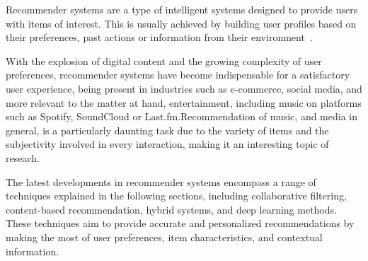 Recommender systems are a type of intelligent systems designed to provide users with items of interest. This is usually achieved by building user profiles based on their preferences, past actions or information from their environment~\cite{BOOK:RS-HANDBOOK}.

With the explosion of digital content and the growing complexity of user preferences, recommender systems have become indispensable for a satisfactory user experience, being present in industries such as e-commerce, social media, and more relevant to the matter at hand, entertainment, including music on platforms such as Spotify, SoundCloud or Last.fm.\@ Recommendation of music, and media in general, is a particularly daunting task due to the variety of items and the subjectivity involved in every interaction, making it an interesting topic of reseach.

The latest developments in recommender systems encompass a range of techniques explained in the following sections, including collaborative filtering, content-based recommendation, hybrid systems, and deep learning methods. These techniques aim to provide accurate and personalized recommendations by making the most of user preferences, item characteristics, and contextual information.